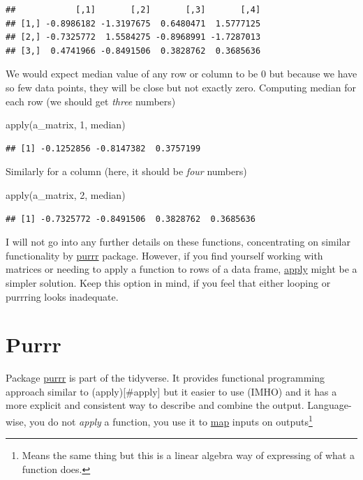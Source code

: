 \documentclass[
]{book}
\newenvironment{Shaded}{\begin{snugshade}}{\end{snugshade}}
\newcommand{\DecValTok}[1]{\textcolor[rgb]{0.00,0.00,0.81}{#1}}
\newcommand{\FunctionTok}[1]{\textcolor[rgb]{0.00,0.00,0.00}{#1}}
\newcommand{\NormalTok}[1]{#1}
\begin{document}
\begin{verbatim}
##            [,1]       [,2]       [,3]       [,4]
## [1,] -0.8986182 -1.3197675  0.6480471  1.5777125
## [2,] -0.7325772  1.5584275 -0.8968991 -1.7287013
## [3,]  0.4741966 -0.8491506  0.3828762  0.3685636
\end{verbatim}

We would expect median value of any row or column to be 0 but because we have so few data points, they will be close but not exactly zero. Computing median for each row (we should get \emph{three} numbers)

\begin{Shaded}
\begin{Highlighting}[]
\FunctionTok{apply}\NormalTok{(a\_matrix, }\DecValTok{1}\NormalTok{, median)}
\end{Highlighting}
\end{Shaded}

\begin{verbatim}
## [1] -0.1252856 -0.8147382  0.3757199
\end{verbatim}

Similarly for a column (here, it should be \emph{four} numbers)

\begin{Shaded}
\begin{Highlighting}[]
\FunctionTok{apply}\NormalTok{(a\_matrix, }\DecValTok{2}\NormalTok{, median)}
\end{Highlighting}
\end{Shaded}

\begin{verbatim}
## [1] -0.7325772 -0.8491506  0.3828762  0.3685636
\end{verbatim}

I will not go into any further details on these functions, concentrating on similar functionality by \protect\hyperlink{purrr}{purrr} package. However, if you find yourself working with matrices or needing to apply a function to rows of a data frame, \href{https://stat.ethz.ch/R-manual/R-devel/library/base/html/apply.html}{apply} might be a simpler solution. Keep this option in mind, if you feel that either looping or purrring looks inadequate.

\hypertarget{purrr}{%
\section{Purrr}\label{purrr}}

Package \href{https://purrr.tidyverse.org/}{purrr} is part of the tidyverse. It provides functional programming approach similar to (apply){[}\#apply{]} but it easier to use (IMHO) and it has a more explicit and consistent way to describe and combine the output. Language-wise, you do not \emph{apply} a function, you use it to \href{https://purrr.tidyverse.org/reference/map.html}{map} inputs on outputs\footnote{Means the same thing but this is a linear algebra way of expressing of what a function does.}
\end{document}
